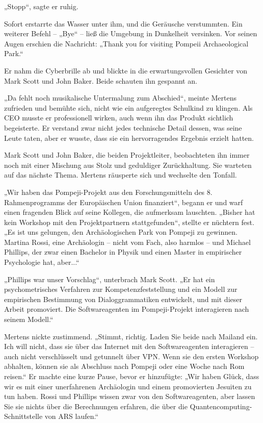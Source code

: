 \documentclass[
]{article}
\begin{document}
„Stopp``, sagte er ruhig.

Sofort erstarrte das Wasser unter ihm, und die Geräusche verstummten.
Ein weiterer Befehl -- „Bye`` -- ließ die Umgebung in Dunkelheit
versinken. Vor seinen Augen erschien die Nachricht: „Thank you for
visiting Pompeii Archaeological Park.``

Er nahm die Cyberbrille ab und blickte in die erwartungsvollen Gesichter
von Mark Scott und John Baker. Beide schauten ihn gespannt an.

„Da fehlt noch musikalische Untermalung zum Abschied``, meinte Mertens
zufrieden und bemühte sich, nicht wie ein aufgeregtes Schulkind zu
klingen. Als CEO musste er professionell wirken, auch wenn ihn das
Produkt sichtlich begeisterte. Er verstand zwar nicht jedes technische
Detail dessen, was seine Leute taten, aber er wusste, dass sie ein
hervorragendes Ergebnis erzielt hatten.

Mark Scott und John Baker, die beiden Projektleiter, beobachteten ihn
immer noch mit einer Mischung aus Stolz und geduldiger Zurückhaltung.
Sie warteten auf das nächste Thema. Mertens räusperte sich und wechselte
den Tonfall.

„Wir haben das Pompeji-Projekt aus den Forschungsmitteln des 8.
Rahmenprogramms der Europäischen Union finanziert``, begann er und warf
einen fragenden Blick auf seine Kollegen, die aufmerksam lauschten.
„Bisher hat kein Workshop mit den Projektpartnern stattgefunden``,
stellte er nüchtern fest. „Es ist uns gelungen, den Archäologischen Park
von Pompeji zu gewinnen. Martina Rossi, eine Archäologin -- nicht vom
Fach, also harmlos -- und Michael Phillips, der zwar einen Bachelor in
Physik und einen Master in empirischer Psychologie hat, aber...``

„Phillips war unser Vorschlag``, unterbrach Mark Scott. „Er hat ein
psychometrisches Verfahren zur Kompetenzfeststellung und ein Modell zur
empirischen Bestimmung von Dialoggrammatiken entwickelt, und mit dieser
Arbeit promoviert. Die Softwareagenten im Pompeji-Projekt interagieren
nach seinem Modell.``

Mertens nickte zustimmend. „Stimmt, richtig. Laden Sie beide nach
Mailand ein. Ich will nicht, dass sie über das Internet mit den
Softwareagenten interagieren -- auch nicht verschlüsselt und getunnelt
über VPN. Wenn sie den ersten Workshop abhalten, können sie als
Abschluss nach Pompeji oder eine Woche nach Rom reisen.`` Er machte eine
kurze Pause, bevor er hinzufügte: „Wir haben Glück, dass wir es mit
einer unerfahrenen Archäologin und einem promovierten Jesuiten zu tun
haben. Rossi und Phillips wissen zwar von den Softwareagenten, aber
lassen Sie sie nichts über die Berechnungen erfahren, die über die
Quantencomputing-Schnittstelle von ARS laufen.``
\end{document}
